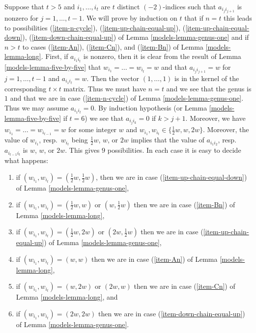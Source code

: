 Suppose that $t > 5$ and $i_1, \ldots, i_t$ are $t$ distinct $(-2)$-indices
such that $a_{i_ji_{j + 1}}$ is nonzero for $j = 1, \ldots, t - 1$. We will
prove by induction on $t$ that if $n = t$ this leads to possibilities
(\ref{item-n-cycle}), (\ref{item-up-chain-equal-up}),
(\ref{item-up-chain-equal-down}), (\ref{item-down-chain-equal-up})
of Lemma \ref{models-lemma-genus-one} and if $n > t$ to cases
(\ref{item-An}), (\ref{item-Cn}), and (\ref{item-Bn}) of
Lemma \ref{models-lemma-long}.
First, if $a_{i_1i_t}$ is nonzero, then it is clear from
the result of Lemma \ref{models-lemma-five-by-five} that
$w_{i_1} = \ldots = w_{i_t} = w$ and that
$a_{i_ji_{j + 1}} = w$ for $j = 1, \ldots, t - 1$ and
$a_{i_1i_t} = w$. Then the vector $(1, \ldots, 1)$ is in the kernel
of the corresponding $t \times t$ matrix. Thus we must have $n = t$
and we see that the genus is $1$ and that we are
in case (\ref{item-n-cycle}) of Lemma \ref{models-lemma-genus-one}.
Thus we may assume $a_{i_1i_t} = 0$.
By induction hypothesis (or Lemma \ref{models-lemma-five-by-five} if $t = 6$)
we see that $a_{i_ji_k} = 0$ if $k > j + 1$.
Moreover, we have $w_{i_1} = \ldots = w_{i_{t - 1}} = w$
for some integer $w$ and $w_{i_1}, w_{i_t} \in \{\frac{1}{2}w, w, 2w\}$.
Moreover, the value of $w_{i_1}$, resp.\ $w_{i_t}$ being
$\frac{1}{2}w$, $w$, or $2w$ implies that the
value of $a_{i_1i_2}$, resp.\ $a_{i_{t - 1}i_t}$
is $w$, $w$, or $2w$. This gives $9$ possibilities.
In each case it is easy to decide what happens:
\begin{enumerate}
\item if $(w_{i_1}, w_{i_t}) = (\frac{1}{2}w, \frac{1}{2}w)$, then
we are in case (\ref{item-up-chain-equal-down}) of
Lemma \ref{models-lemma-genus-one},
\item if $(w_{i_1}, w_{i_t}) = (\frac{1}{2}w, w)$ or $(w, \frac{1}{2}w)$
then we are in case (\ref{item-Bn}) of Lemma \ref{models-lemma-long},
\item if $(w_{i_1}, w_{i_t}) = (\frac{1}{2}w, 2w)$ or $(2w, \frac{1}{2}w)$
then we are in case (\ref{item-up-chain-equal-up}) of
Lemma \ref{models-lemma-genus-one},
\item if $(w_{i_1}, w_{i_t}) = (w, w)$ then we are in case
(\ref{item-An}) of Lemma \ref{models-lemma-long},
\item if $(w_{i_1}, w_{i_t}) = (w, 2w)$ or $(2w, w)$ then we are
in case (\ref{item-Cn}) of Lemma \ref{models-lemma-long}, and
\item if $(w_{i_1}, w_{i_t}) = (2w, 2w)$ then we are in case
(\ref{item-down-chain-equal-up}) of Lemma \ref{models-lemma-genus-one}.
\end{enumerate}

